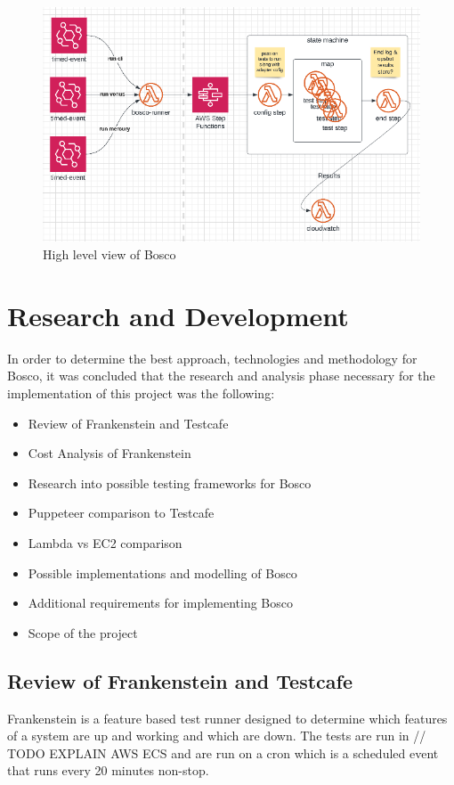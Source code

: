 \documentclass[12pt,a4paper,titlepage]{report}
\begin{document}
\begin{figure}[ht]
 \centering
 \includegraphics[width=\textwidth,height=\textheight,keepaspectratio]{./diagrams/bosco_high_level.png}
 \caption{High level view of Bosco}
\end{figure}

\chapter{Research and Development}

In order to determine the best approach, technologies and methodology for Bosco, it was concluded that the research and analysis phase necessary for the implementation of this project was the following:

\begin{itemize}
 \item Review of Frankenstein and Testcafe
 \item Cost Analysis of Frankenstein
 \item Research into possible testing frameworks for Bosco
 \item Puppeteer comparison to Testcafe
 \item Lambda vs EC2 comparison
 \item Possible implementations and modelling of Bosco
 \item Additional requirements for implementing Bosco
 \item Scope of the project
\end{itemize}

\section{Review of Frankenstein and Testcafe}
Frankenstein is a feature based test runner designed to determine
which features of a system are up and working and which are down.
The tests are run in // TODO EXPLAIN AWS ECS and are run on a cron which is a scheduled event that runs every 20 minutes non-stop.
\end{document}
